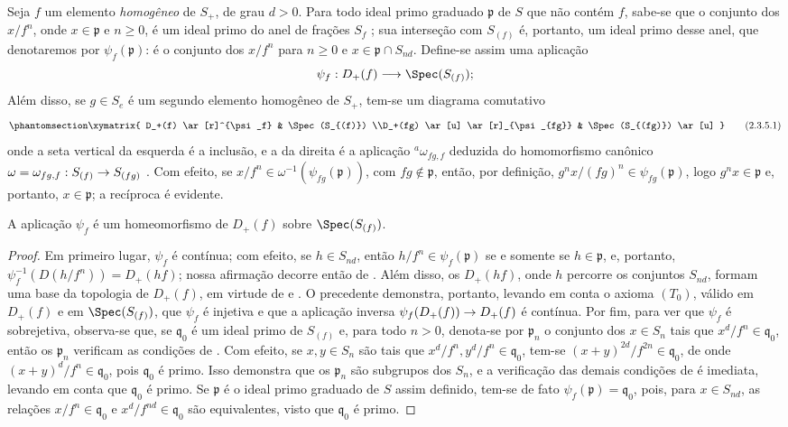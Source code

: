 \documentclass[oneside,10pt]{amsart}
\makeatletter
\renewcommand{\geq}{\geqslant}
\newcommand{\ega@arrow}[2]{\mathchoice{#1}{#2}{#2}{#2}}
\renewcommand{\to}{\ega@arrow{\longrightarrow}{\rightarrow}}
\newcommand{\oldpage}[2][]{\marginnote{\normalfont\footnotesize\textbf{#1}~|~#2}\ignorespaces}
\let\EGAOriginalLabel\label
\renewcommand{\label}[1]{\phantomsection\EGAOriginalLabel{#1}}
\makeatother
\begin{document}
\begin{env}[2.3.5]
\label{II.2.3.5}
Seja $f$ um elemento \emph{homogêneo} de $S_+$, de grau $d>0$.
Para todo ideal primo graduado $\mathfrak{p}$ de $S$ que não contém $f$, sabe-se que o conjunto dos $x/f^n$, onde $x\in\mathfrak{p}$ e $n\geq0$, é um ideal primo do anel de frações $S_f$ ; sua interseção com $S_{(f)}$ é, portanto, um ideal primo desse anel, que denotaremos por $\psi_f(\mathfrak{p})$: é o conjunto dos $x/f^n$ para $n\geq0$ e $x\in\mathfrak{p}\cap S_{nd}$.
Define-se assim uma aplicação
\[
  \psi_f:D_+(f)\to\Spec(S_{(f)});
\]
Além disso, se $g\in S_e$ é um segundo elemento homogêneo de $S_+$, tem-se um diagrama comutativo
\[
\label{II.2.3.5.1}
  \xymatrix{
    D_+(f) \ar[r]^{\psi_f}
    & \Spec(S_{(f)})
  \\D_+(fg) \ar[u] \ar[r]_{\psi_{fg}}
    & \Spec(S_{(fg)}) \ar[u]
  }
\tag{2.3.5.1}
\]
onde a seta vertical da esquerda é a inclusão, e a da direita é a aplicação ${}^a\!\omega_{fg,f}$ deduzida do homomorfismo canônico $\omega=\omega_{fg,f}:S_{(f)}\to S_{(fg)}$ .
Com efeito, se $x/f^n\in\omega^{-1}(\psi_{fg}(\mathfrak{p}))$, com $fg\notin\mathfrak{p}$, então, por definição, $g^nx/(fg)^n\in\psi_{fg}(\mathfrak{p})$, logo $g^nx\in\mathfrak{p}$ e, portanto, $x\in\mathfrak{p}$; a recíproca é evidente.
\end{env}

\begin{proposition}[2.3.6]
\label{II.2.3.6}
A aplicação $\psi_f$ é um homeomorfismo de $D_+(f)$ sobre $\Spec(S_{(f)})$.
\end{proposition}

\begin{proof}
Em primeiro lugar, $\psi_f$ é contínua; com efeito, se $h\in S_{nd}$, então $h/f^n\in\psi_f(\mathfrak{p})$ se e somente se $h\in\mathfrak{p}$, e, portanto, $\psi_f^{-1}(D(h/f^n))=D_+(hf)$; nossa afirmação decorre então de .
Além disso, os $D_+(hf)$, onde $h$ percorre os conjuntos $S_{nd}$, formam uma base da topologia de $D_+(f)$, em virtude de  e .
O
\oldpage[II]{27}
precedente demonstra, portanto, levando em conta o axioma $(T_0)$, válido em $D_+(f)$ e em $\Spec(S_{(f)})$, que $\psi_f$ é injetiva e que a aplicação inversa $\psi_f(D_+(f))\to D_+(f)$ é contínua.
Por fim, para ver que $\psi_f$ é sobrejetiva, observa-se que, se $\mathfrak{q}_0$ é um ideal primo de $S_{(f)}$ e, para todo $n>0$, denota-se por $\mathfrak{p}_n$ o conjunto dos $x\in S_n$ tais que $x^d/f^n\in\mathfrak{q}_0$, então os $\mathfrak{p}_n$ verificam as condições de .
Com efeito, se $x,y\in S_n$ são tais que $x^d/f^n,y^d/f^n\in\mathfrak{q}_0$, tem-se $(x+y)^{2d}/f^{2n}\in\mathfrak{q}_0$, de onde $(x+y)^d/f^n\in\mathfrak{q}_0$, pois $\mathfrak{q}_0$ é primo.
Isso demonstra que os $\mathfrak{p}_n$ são subgrupos dos $S_n$, e a verificação das demais condições de  é imediata, levando em conta que $\mathfrak{q}_0$ é primo.
Se $\mathfrak{p}$ é o ideal primo graduado de $S$ assim definido, tem-se de fato $\psi_f(\mathfrak{p})=\mathfrak{q}_0$, pois, para $x\in S_{nd}$, as relações $x/f^n\in\mathfrak{q}_0$ e $x^d/f^{nd}\in\mathfrak{q}_0$ são equivalentes, visto que $\mathfrak{q}_0$ é primo.
\end{proof}
\end{document}
